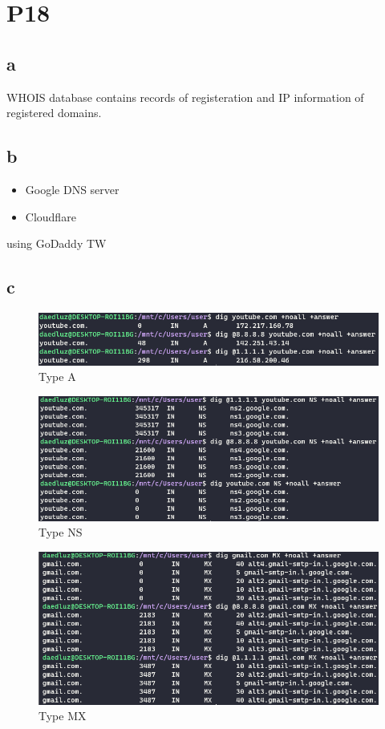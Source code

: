 \documentclass[11pt,a4paper]{article}
\begin{document}
\section{P18}
\subsection{a}
WHOIS database contains records of registeration and IP information of registered domains.

\subsection{b}
\begin{itemize}
    \item Google DNS server
    \item Cloudflare
\end{itemize}
using GoDaddy TW

\subsection{c}
\begin{figure}[H]
    \centering
    \includegraphics[width=\linewidth]{./img/TypeA.png}
    \caption{Type A}
    \label{Type A}
\end{figure}

\begin{figure}[H]
    \includegraphics[width=\linewidth]{./img/TypeNS.png}
    \caption{Type NS}
    \label{Type NS}
\end{figure}

\begin{figure}[H]
    \includegraphics[width=\linewidth]{./img/TypeMX.png}
    \caption{Type MX}
    \label{Type MX}
\end{figure}
\end{document}
